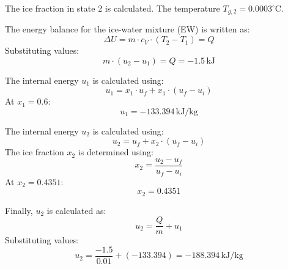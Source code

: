 The ice fraction in state 2 is calculated. The temperature \( T_{g,2} = 0.0003^\circ\text{C} \).  

The energy balance for the ice-water mixture (EW) is written as:  
\[
\Delta U = m \cdot c_V \cdot (T_2 - T_1) = Q
\]  
Substituting values:  
\[
m \cdot (u_2 - u_1) = Q = -1.5 \, \text{kJ}
\]  

The internal energy \( u_1 \) is calculated using:  
\[
u_1 = x_1 \cdot u_f + x_1 \cdot (u_f - u_i)
\]  
At \( x_1 = 0.6 \):  
\[
u_1 = -133.394 \, \text{kJ/kg}
\]  

The internal energy \( u_2 \) is calculated using:  
\[
u_2 = u_f + x_2 \cdot (u_f - u_i)
\]  
The ice fraction \( x_2 \) is determined using:  
\[
x_2 = \frac{u_2 - u_f}{u_f - u_i}
\]  
At \( x_2 = 0.4351 \):  
\[
x_2 = 0.4351
\]  

Finally, \( u_2 \) is calculated as:  
\[
u_2 = \frac{Q}{m} + u_1
\]  
Substituting values:  
\[
u_2 = \frac{-1.5}{0.01} + (-133.394) = -188.394 \, \text{kJ/kg}
\]